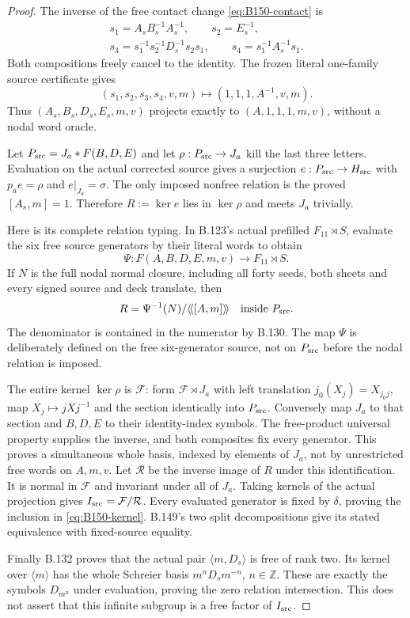 \begin{proof}
The inverse of the free contact change \eqref{eq:B150-contact} is
\begin{equation}\label{eq:B150-inverse}
\begin{gathered}
 s_1=A_sB_s^{-1}A_s^{-1},\qquad s_2=E_s^{-1},\\
 s_3=s_1^{-1}s_2^{-1}D_s^{-1}s_2s_1,
 \qquad s_4=s_1^{-1}A_s^{-1}s_1.
\end{gathered}
\end{equation}
Both compositions freely cancel to the identity. The frozen literal
one-family source certificate gives
\[
 (s_1,s_2,s_3,s_4,v,m)\longmapsto(1,1,1,A^{-1},v,m).
\]
Thus $(A_s,B_s,D_s,E_s,m,v)$ projects exactly to
$(A,1,1,1,m,v)$, without a nodal word oracle.

Let $P_{\rm src}=J_a*F(B,D,E)$ and let
$\rho:P_{\rm src}\to J_a$ kill the last three letters. Evaluation
on the actual corrected source gives a surjection
$e:P_{\rm src}\to H_{\rm src}$ with $p_ae=\rho$ and
$e|_{J_a}=\sigma$. The only imposed nonfree relation is the proved
$[A_s,m]=1$. Therefore $R:=\ker e$ lies in $\ker\rho$ and meets
$J_a$ trivially.

Here is its complete relation typing. In B.123's actual prefilled
$F_{11}\rtimes S$, evaluate the six free source generators by their
literal words to obtain
\[
 \Psi:F(A,B,D,E,m,v)\longrightarrow F_{11}\rtimes S.
\]
If $N$ is the full nodal normal closure, including all forty seeds,
both sheets and every signed source and deck translate, then
\[
 R=\Psi^{-1}(N)/\langle\!\langle[A,m]\rangle\!\rangle
 \quad\hbox{inside }P_{\rm src}.
\]
The denominator is contained in the numerator by B.130. The map
$\Psi$ is deliberately defined on the free six-generator source,
not on $P_{\rm src}$ before the nodal relation is imposed.

The entire kernel $\ker\rho$ is $\mathcal F$: form
$\mathcal F\rtimes J_a$ with left translation
$j_0(X_j)=X_{j_0j}$, map $X_j\mapsto jXj^{-1}$ and the section
identically into $P_{\rm src}$. Conversely map $J_a$ to that section
and $B,D,E$ to their identity-index symbols. The free-product
universal property supplies the inverse, and both composites fix
every generator. This proves a simultaneous whole basis, indexed by
elements of $J_a$, not by unrestricted free words on $A,m,v$.
Let $\mathcal R$ be the inverse image of $R$ under this identification.
It is normal in $\mathcal F$ and invariant under all of $J_a$.
Taking kernels of the actual projection gives
$I_{\rm src}=\mathcal F/\mathcal R$. Every evaluated generator is
fixed by $\delta$, proving the inclusion in
\eqref{eq:B150-kernel}. B.149's two split decompositions give its
stated equivalence with fixed-source equality.

Finally B.132 proves that the actual pair $\langle m,D_s\rangle$ is
free of rank two. Its kernel over $\langle m\rangle$ has the whole
Schreier basis $m^nD_sm^{-n}$, $n\in\mathbb Z$. These are exactly the
symbols $D_{m^n}$ under evaluation, proving the zero relation
intersection. This does not assert that this infinite subgroup is a
free factor of $I_{\rm src}$.
\end{proof}

